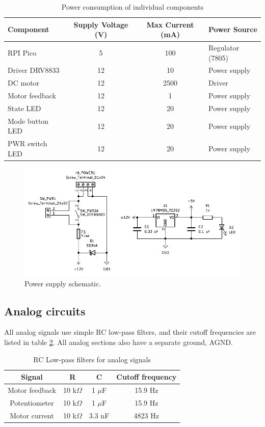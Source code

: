 \begin{table}[h!]
\centering
\begin{tabular}{|l|c|c|l|}
\hline
\textbf{Component} & \textbf{Supply Voltage (V)} & \textbf{Max Current (mA)} & \textbf{Power Source}\\
\hline
RPI Pico           & 5  & 100  & Regulator (7805) \\
\hline
Driver DRV8833     & 12 & 10   & Power supply \\
\hline
DC motor           & 12 & 2500 & Driver \\
\hline
Motor feedback     & 12 & 1    & Power supply \\
\hline
State LED          & 12 & 20   & Power supply      \\
\hline
Mode button LED    & 12 & 20   & Power supply  \\
\hline
PWR switch LED     & 12 & 20   & Power supply       \\
\hline
\end{tabular}
\caption{Power consumption of individual components}
\label{tab:power_consumption}
\end{table}

\begin{figure}[h!]
    \centering
    \includegraphics[width=\textwidth]{images/power_schematic.pdf}
    \caption{Power supply schematic.}
    \label{fig:power_schematic}
\end{figure}

\newpage
\subsection{Analog circuits}
All analog signals use simple RC low-pass filters, and their cutoff frequencies are listed in table \ref{tab:rc_filters}. All analog sections also have a separate ground, AGND.

\begin{table}[h!]
\centering
\begin{tabular}{|c|c|c|c|}
\hline
\textbf{Signal} & \textbf{R} & \textbf{C} & \textbf{Cutoff frequency} \\ \hline
Motor feedback & 10 k$\Omega$ & 1 $\mu$F & 15.9 Hz \\ \hline
Potentiometer & 10 k$\Omega$ & 1 $\mu$F & 15.9 Hz\\ \hline
Motor current & 10 k$\Omega$ & 3.3 nF & 4823 Hz\\ \hline
\end{tabular}
\caption{RC Low-pass filters for analog signals}
\label{tab:rc_filters}
\end{table}

